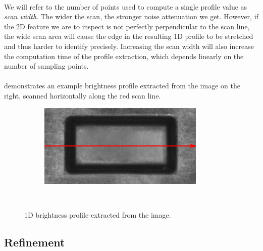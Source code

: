 \paragraph*{}
We will refer to the number of points used to compute a single profile value as \textit{scan width}. The wider the scan, the stronger noise attenuation we get. However, if the 2D feature we are to inspect is not perfectly perpendicular to the scan line, the wide scan area will cause the edge in the resulting 1D profile to be stretched and thus harder to identify precisely. Increasing the scan width will also increase the computation time of the profile extraction, which depends linearly on the number of sampling points.

\paragraph*{}
 demonstrates an example brightness profile extracted from the image on the right, scanned horizontally along the red scan line.

\begin{figure}[h!]
    \begin{subfigure}[b]{\basicWidth}
		\includegraphics[width=\linewidth]{img/1DEdgeDetection/edges_scan}
    \end{subfigure}%
    ~
    \begin{subfigure}[b]{\basicWidth}
    \end{subfigure}
    \caption{1D brightness profile extracted from the image.}
    \label{fig:EdgesProfileExtraction}
\end{figure}

\subsection{Refinement}

